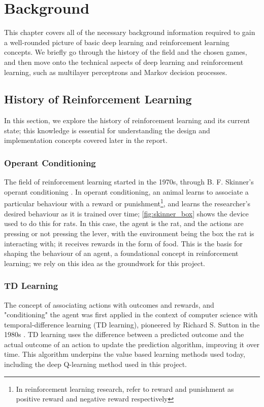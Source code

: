 \chapter{Background}
This chapter covers all of the necessary background information required to
gain a well-rounded picture of basic deep learning and reinforcement learning
concepts. We briefly go through the history of the field and the chosen games,
and then move onto the technical aspects of deep learning and reinforcement
learning, such as multilayer perceptrons and Markov decision processes.

\section{History of Reinforcement Learning}

In this section, we explore the history of reinforcement learning and its
current state; this knowledge is essential for understanding the design and
implementation concepts covered later in the report.

\subsection{Operant Conditioning}
The field of reinforcement learning started in the 1970s, through B. F.
Skinner's operant conditioning \cite{skinner1971operant}. In operant
conditioning, an animal learns to associate a particular behaviour with a
reward or punishment\footnote{In reinforcement learning research, refer to
  reward and punishment as positive reward and negative reward respectively}, and
learns the researcher's desired behaviour as it is trained over time;
\autoref{fig:skinner_box} shows the device used to do this for rats. In this
case, the agent is the rat, and the actions are pressing or not pressing the
lever, with the environment being the box the rat is interacting with; it
receives rewards in the form of food. This is the basis for shaping the
behaviour of an agent, a foundational concept in reinforcement learning; we
rely on this idea as the groundwork for this project.



\subsection{TD Learning}
The concept of associating actions with outcomes and rewards, and
"conditioning" the agent was first applied in the context of computer science
with temporal-difference learning (TD learning), pioneered by Richard S. Sutton
in the 1980s \cite{sutton1988learning}. TD learning uses the difference between
a predicted outcome and the actual outcome of an action to update the
prediction algorithm, improving it over time. This algorithm underpins the
value based learning methods used today, including the deep Q-learning method
used in this project.

